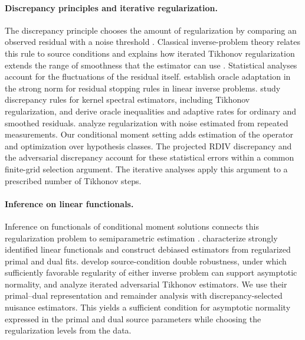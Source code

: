\documentclass[12pt]{article}
\theoremstyle{plain}
\theoremstyle{definition}
\theoremstyle{remark}
\begin{document}
\paragraph{Discrepancy principles and iterative regularization.}
The discrepancy principle chooses the amount of regularization by comparing an observed residual with a noise threshold \citep{morozov1966solution,morozov1984methods}. Classical inverse-problem theory relates this rule to source conditions and explains how iterated Tikhonov regularization extends the range of smoothness that the estimator can use \citep{engl1996regularization,nair2003morozov}. Statistical analyses account for the fluctuations of the residual itself. \citet{blanchard2018optimal} establish oracle adaptation in the strong norm for residual stopping rules in linear inverse problems. \citet{celisse2021discrepancy} study discrepancy rules for kernel spectral estimators, including Tikhonov regularization, and derive oracle inequalities and adaptive rates for ordinary and smoothed residuals. \citet{harrach2020beyond} analyze regularization with noise estimated from repeated measurements. Our conditional moment setting adds estimation of the operator and optimization over hypothesis classes. The projected RDIV discrepancy and the adversarial discrepancy account for these statistical errors within a common finite-grid selection argument. The iterative analyses apply this argument to a prescribed number of Tikhonov steps.

\paragraph{Inference on linear functionals.}
Inference on functionals of conditional moment solutions connects this regularization problem to semiparametric estimation \citep{aiEfficientEstimationModels2003}. \citet{bennettInferenceStronglyIdentified2023a} characterize strongly identified linear functionals and construct debiased estimators from regularized primal and dual fits. \citet{bennett2023source} develop source-condition double robustness, under which sufficiently favorable regularity of either inverse problem can support asymptotic normality, and analyze iterated adversarial Tikhonov estimators. We use their primal--dual representation and remainder analysis with discrepancy-selected nuisance estimators. This yields a sufficient condition for asymptotic normality expressed in the primal and dual source parameters while choosing the regularization levels from the data.
\end{document}
